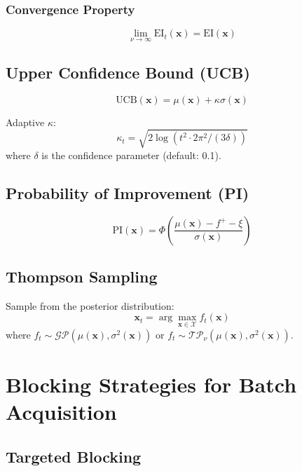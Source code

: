 \documentclass[11pt,a4paper]{article}
\begin{document}
\subsubsection{Convergence Property}
\begin{equation}
    \lim_{\nu \rightarrow \infty} \text{EI}_t(\mathbf{x}) = \text{EI}(\mathbf{x})
\end{equation}

\subsection{Upper Confidence Bound (UCB)}

\begin{equation}
    \text{UCB}(\mathbf{x}) = \mu(\mathbf{x}) + \kappa \sigma(\mathbf{x})
\end{equation}

Adaptive $\kappa$:
\begin{equation}
    \kappa_t = \sqrt{2 \log(t^2 \cdot 2\pi^2 / (3\delta))}
\end{equation}
where $\delta$ is the confidence parameter (default: 0.1).

\subsection{Probability of Improvement (PI)}

\begin{equation}
    \text{PI}(\mathbf{x}) = \Phi\left(\frac{\mu(\mathbf{x}) - f^+ - \xi}{\sigma(\mathbf{x})}\right)
\end{equation}

\subsection{Thompson Sampling}

Sample from the posterior distribution:
\begin{equation}
    \mathbf{x}_t = \arg\max_{\mathbf{x} \in \mathcal{X}} f_t(\mathbf{x})
\end{equation}
where $f_t \sim \mathcal{GP}(\mu(\mathbf{x}), \sigma^2(\mathbf{x}))$ or $f_t \sim \mathcal{TP}_\nu(\mu(\mathbf{x}), \sigma^2(\mathbf{x}))$.

\section{Blocking Strategies for Batch Acquisition}

\subsection{Targeted Blocking}
\end{document}
